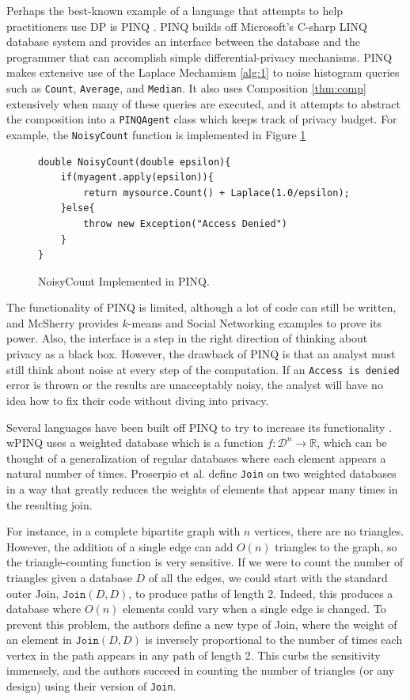 \documentclass[11pt]{article}
\begin{document}
Perhaps the best-known example of a language that attempts to help practitioners use DP is PINQ \cite{McSherry:2010}. PINQ builds off Microsoft's C-sharp LINQ database system and provides an interface between the database and the programmer that can accomplish simple differential-privacy mechanisms. PINQ makes extensive use of the Laplace Mechamism \ref{alg:1} to noise histogram queries such as \texttt{Count}, \texttt{Average}, and \texttt{Median}. It also uses Composition \ref{thm:comp} extensively when many of these queries are executed, and it attempts to abstract the composition into a \texttt{PINQAgent} class which keeps track of privacy budget. For example, the \texttt{NoisyCount} function is implemented in Figure \ref{fig:PINQNoisyCount}
\begin{figure}
\begin{verbatim}
double NoisyCount(double epsilon){
    if(myagent.apply(epsilon)){
        return mysource.Count() + Laplace(1.0/epsilon);
    }else{
        throw new Exception("Access Denied")
    }
}
\end{verbatim}
\caption{NoisyCount Implemented in PINQ.}
\label{fig:PINQNoisyCount}
\end{figure}
The functionality of PINQ is limited, although a lot of code can still be written, and McSherry provides $k$-means and Social Networking examples to prove its power. Also, the interface is a step in the right direction of thinking about privacy as a black box. However, the drawback of PINQ is that an analyst must still think about noise at every step of the computation. If an \texttt{Access is denied} error is thrown or the results are unacceptably noisy, the analyst will have no idea how to fix their code without diving into privacy.

Several languages have been built off PINQ to try to increase its functionality \cite{Proserpio:2014} \cite{Johnson:2017}. wPINQ \cite{Proserpio:2014} uses a weighted database which is a function $f : \mathcal{D}^n \rightarrow \mathbb{R}$, which can be thought of a generalization of regular databases where each element appears a natural number of times. Proserpio et al. define \texttt{Join} on two weighted databases in a way that greatly reduces the weights of elements that appear many times in the resulting join.

For instance, in a complete bipartite graph with $n$ vertices, there are no triangles. However, the addition of a single edge can add $O(n)$ triangles to the graph, so the triangle-counting function is very sensitive. If we were to count the number of triangles given a database $D$ of all the edges, we could start with the standard outer Join, $\texttt{Join}(D, D)$, to produce paths of length 2. Indeed, this produces a database where $O(n)$ elements could vary when a single edge is changed. To prevent this problem, the authors define a new type of Join, where the weight of an element in $\texttt{Join}(D, D)$ is inversely proportional to the number of times each vertex in the path appears in any path of length 2. This curbs the sensitivity immensely, and the authors succeed in counting the number of triangles (or any design) using their version of \texttt{Join}.
\end{document}
